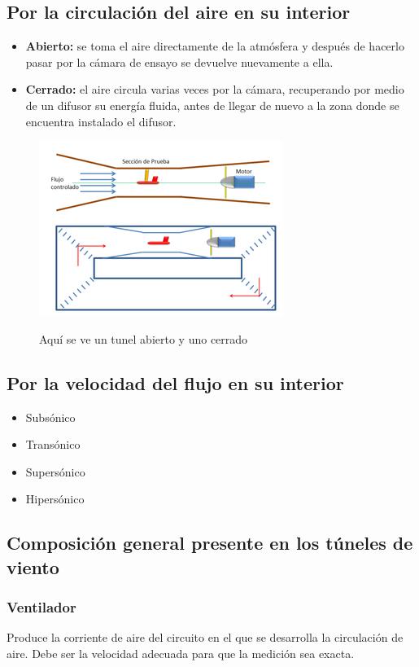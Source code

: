 \documentclass[10pt,a4paper]{article}
\begin{document}
\subsection{Por la circulación del aire en su interior}
\begin{itemize}
\item \textbf{Abierto:}  se toma el aire directamente de la atmósfera y después de hacerlo pasar por la cámara de ensayo se devuelve nuevamente a ella.
\item \textbf{Cerrado:} el aire circula varias veces por la cámara, recuperando por medio de un difusor su energía fluida, antes de llegar de nuevo a la zona donde se encuentra instalado el difusor.

\end{itemize}

\begin{figure}[h]
\centering
\includegraphics[scale=0.7]{tunel.png}
\label{abiertocerrado}
\caption{Aquí se ve un tunel abierto y uno cerrado}
\end{figure}
\subsection{Por la velocidad del flujo en su interior}
\begin{itemize}
\item{Subsónico}
\item{Transónico}
\item{Supersónico}
\item{Hipersónico}

\end{itemize}
\subsection{Composición general presente en los túneles de viento}
\subsubsection{Ventilador}
Produce la corriente de aire del circuito en el que se desarrolla la circulación de aire. Debe ser la velocidad adecuada para que la medición sea exacta.
\end{document}
